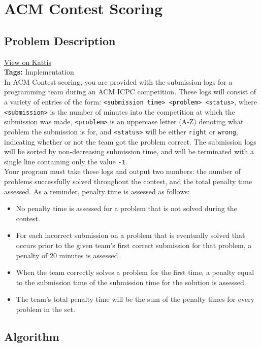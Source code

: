 \section{ACM Contest Scoring}
\label{acmcontestscoring}
\subsection{Problem Description}

\href{https://open.kattis.com/problems/acm}{View on Kattis}\\
\textbf{Tags:} Implementation\\

In ACM Contest scoring, you are provided with the submission logs for a programming team during an ACM ICPC competition. These logs will consist of a variety of entries of the form: \verb|<submission time> <problem> <status>|, where \verb|<submission>| is the number of minutes into the competition at which the submission was made, \verb|<problem>| is an uppercase letter (A-Z) denoting what problem the submission is for, and \verb|<status>| will be either \verb|right| or \verb|wrong|, indicating whether or not the team got the problem correct.	The submission logs will be sorted by non-decreasing submission time, and will be terminated with a single line containing only the value \verb|-1|.\\

Your program must take these logs and output two numbers: the number of problems successfully solved throughout the contest, and the total penalty time assessed. As a reminder, penalty time is assessed as follows:
\begin{itemize}
	\item No penalty time is assessed for a problem that is not solved during the contest.
	\item For each incorrect submission on a problem that is eventually solved that occurs prior to the given team's first correct submission for that problem, a penalty of 20 minutes is assessed.
	\item When the team correctly solves a problem for the first time, a penalty equal to the submission time of the submission time for the solution is assessed.
	\item The team's total penalty time will be the sum of the penalty times for every problem in the set.
\end{itemize}

\subsection{Algorithm}

